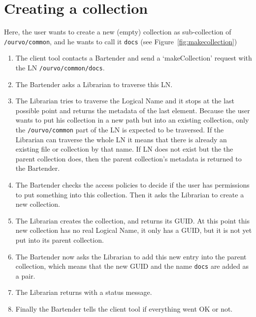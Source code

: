 \documentclass{book}
\begin{document}

\section{Creating a collection} %
\label{sec:creating_a_collection}
\begin{figure}[ht]
\end{figure}

Here, the user wants to create a new (empty) collection as sub-collection of \verb#/ourvo/common#, and he wants to call it \verb!docs! (see Figure~\ref{fig:makecollection})

\begin{enumerate}
    \item The client tool contacts a Bartender and send a `makeCollection' request with the LN \verb!/ourvo/common/docs!.
    \item The Bartender asks a Librarian to traverse this LN.
    \item The Librarian tries to traverse the Logical Name and it stops at the last possible point and returns the metadata of the last element. Because the user wants to put his collection in a new path but into an existing collection, only the \verb#/ourvo/common# part of the LN is expected to be traversed. If the Librarian can traverse the whole LN it means that there is already an existing file or collection by that name. If LN does not exist but the the parent collection does, then the parent collection's metadata is returned to the Bartender. 
    \item The Bartender checks the access policies to decide if the user has permissions to put something into this collection. Then it asks the Librarian to create a new collection.
    \item The Librarian creates the collection, and returns its GUID. At this point this new collection has no real Logical Name, it only has a GUID, but it is not yet put into its parent collection.
    \item The Bartender now asks the Librarian to add this new entry into the parent collection, which means that the new GUID and the name \verb!docs! are added as a pair.
    \item The Librarian returns with a status message.
    \item Finally the Bartender tells the client tool if everything went OK or not.
\end{enumerate}
\end{document}
